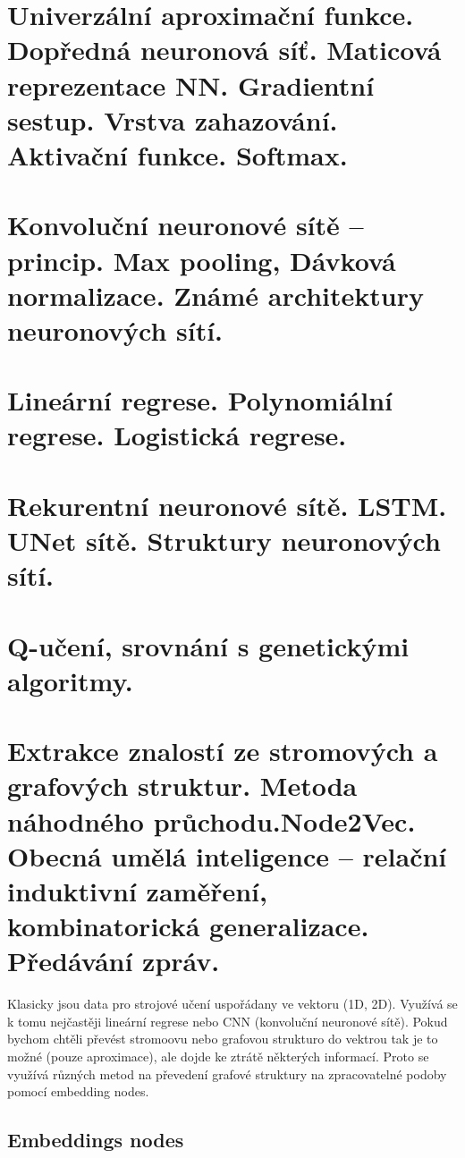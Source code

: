 \clearpage
\section{Univerzální aproximační funkce. Dopředná neuronová síť. Maticová reprezentace NN. Gradientní sestup. Vrstva zahazování. Aktivační funkce. Softmax.}


\clearpage
\section{Konvoluční neuronové sítě – princip. Max pooling, Dávková normalizace. Známé architektury neuronových sítí.}


\clearpage
\section{Lineární regrese. Polynomiální regrese. Logistická regrese.}


\clearpage
\section{Rekurentní neuronové sítě. LSTM. UNet sítě. Struktury neuronových sítí.}


\clearpage
\section{Q-učení, srovnání s genetickými algoritmy.}

\clearpage
\section{Extrakce znalostí ze stromových a grafových struktur. Metoda náhodného průchodu.Node2Vec. Obecná umělá inteligence – relační induktivní zaměření, kombinatorická generalizace. Předávání zpráv.}

Klasicky jsou data pro strojové učení uspořádany ve vektoru (1D, 2D). 
Využívá se k tomu nejčastěji lineární regrese nebo CNN (konvoluční neuronové sítě). 
Pokud bychom chtěli převést stromoovu nebo grafovou strukturo do vektrou tak je to možné (pouze aproximace), ale dojde ke ztrátě některých informací. 
Proto se využívá různých metod na převedení grafové struktury na zpracovatelné podoby pomocí embedding nodes.

\subsection{Embeddings nodes}

